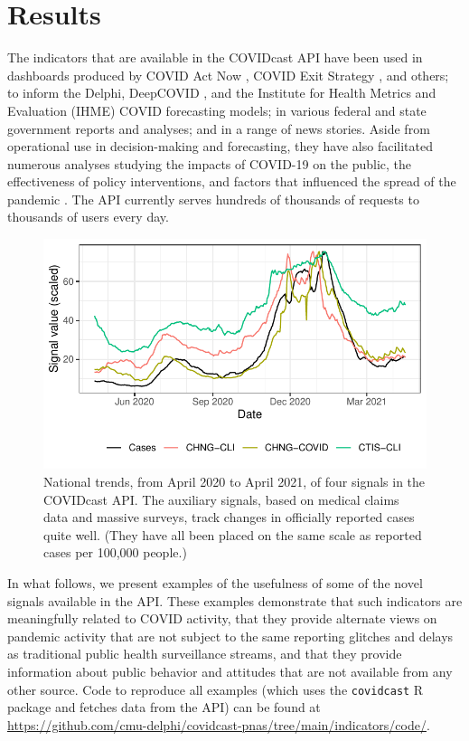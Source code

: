\documentclass[9pt,twocolumn,twoside,lineno]{pnas-new}
\begin{document}
\section{Results}

The indicators that are available in the COVIDcast API have been used in
dashboards produced by COVID Act Now \cite{CovidActNow}, COVID Exit Strategy
\cite{CovidExitStrategy}, and others; to inform the Delphi, DeepCOVID
\cite{Rodriguez:2021}, and the Institute for Health Metrics and Evaluation
(IHME) \cite{IHMEProj} COVID forecasting models; in various federal and state
government reports and analyses; and in a range of news stories. Aside from
operational use in decision-making and forecasting, they have also facilitated
numerous analyses studying the impacts of COVID-19 on the public, the
effectiveness of policy interventions, and factors that influenced the spread of
the pandemic \cite{Adjodah:2021, Pierri:2021, Jewell:2021, Chakrabarti:2020,
  Doerr:2021}. The API currently serves hundreds of thousands of requests to
thousands of users every day.

\begin{figure}[t]
  \includegraphics[width=\columnwidth]{fig/time_trends_national.pdf}
  \caption{National trends, from April 2020 to April 2021, of four signals in 
    the COVIDcast API. The auxiliary signals, based on medical claims data and 
    massive surveys, track changes in officially reported cases quite
    well. (They have all been placed on the same scale as reported cases per 
    100,000 people.)}
  \label{fig:time_trends_national}
\end{figure}

In what follows, we present examples of the usefulness of some of the novel
signals available in the API. These examples demonstrate that such indicators
are meaningfully related to COVID activity, that they provide alternate views on
pandemic activity that are not subject to the same reporting glitches and delays
as traditional public health surveillance streams, and that they provide
information about public behavior and attitudes that are not available from any
other source. Code to reproduce all examples (which uses the \texttt{covidcast}
R package and fetches data from the API) can be found at
\url{https://github.com/cmu-delphi/covidcast-pnas/tree/main/indicators/code/}. 
\end{document}
